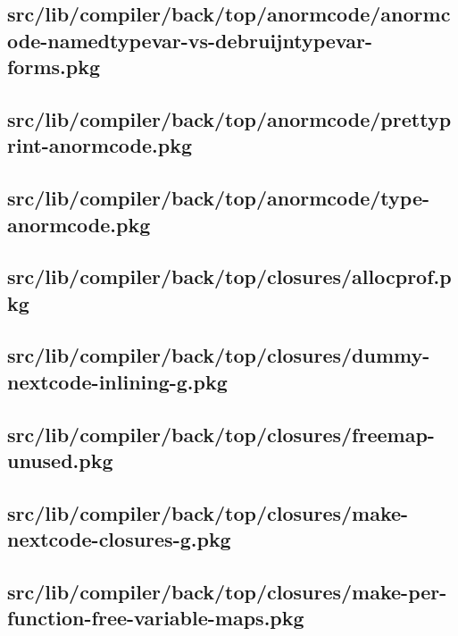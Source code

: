 \subsection{src/lib/compiler/back/top/anormcode/anormcode-namedtypevar-vs-debruijntypevar-forms.pkg}


\subsection{src/lib/compiler/back/top/anormcode/prettyprint-anormcode.pkg}


\subsection{src/lib/compiler/back/top/anormcode/type-anormcode.pkg}


\subsection{src/lib/compiler/back/top/closures/allocprof.pkg}


\subsection{src/lib/compiler/back/top/closures/dummy-nextcode-inlining-g.pkg}


\subsection{src/lib/compiler/back/top/closures/freemap-unused.pkg}


\subsection{src/lib/compiler/back/top/closures/make-nextcode-closures-g.pkg}


\subsection{src/lib/compiler/back/top/closures/make-per-function-free-variable-maps.pkg}


